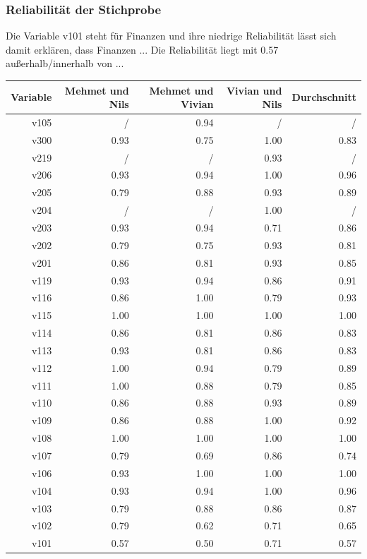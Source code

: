 \subsubsection{Reliabilität der Stichprobe} 
Die Variable v101 steht für Finanzen und ihre niedrige Reliabilität lässt sich damit erklären, dass Finanzen ... Die Reliabilität liegt mit 0.57 außerhalb/innerhalb von ...  
\begin{table}[H]
	\centering
	\begin{longtable}{rrrrr}
		\hline
		Variable & Mehmet und Nils & Mehmet und Vivian & Vivian und Nils & Durchschnitt \\ 
		\hline \hline
		v105 & / & 0.94 & / & / \\ 
		v300 & 0.93 & 0.75 & 1.00 & 0.83 \\ 
		v219 & / & / & 0.93 & / \\ 
		v206 & 0.93 & 0.94 & 1.00 & 0.96 \\ 
		v205 & 0.79 & 0.88 & 0.93 & 0.89 \\ 
		v204 & / & / & 1.00 & / \\ 
		v203 & 0.93 & 0.94 & 0.71 & 0.86 \\ 
		v202 & 0.79 & 0.75 & 0.93 & 0.81 \\ 
		v201 & 0.86 & 0.81 & 0.93 & 0.85 \\ 
		v119 & 0.93 & 0.94 & 0.86 & 0.91 \\ 
		v116 & 0.86 & 1.00 & 0.79 & 0.93 \\ 
		v115 & 1.00 & 1.00 & 1.00 & 1.00 \\ 
		v114 & 0.86 & 0.81 & 0.86 & 0.83 \\ 
		v113 & 0.93 & 0.81 & 0.86 & 0.83 \\ 
		v112 & 1.00 & 0.94 & 0.79 & 0.89 \\ 
		v111 & 1.00 & 0.88 & 0.79 & 0.85 \\ 
		v110 & 0.86 & 0.88 & 0.93 & 0.89 \\ 
		v109 & 0.86 & 0.88 & 1.00 & 0.92 \\ 
		v108 & 1.00 & 1.00 & 1.00 & 1.00 \\ 
		v107 & 0.79 & 0.69 & 0.86 & 0.74 \\ 
		v106 & 0.93 & 1.00 & 1.00 & 1.00 \\ 
		v104 & 0.93 & 0.94 & 1.00 & 0.96 \\ 
		v103 & 0.79 & 0.88 & 0.86 & 0.87 \\ 
		v102 & 0.79 & 0.62 & 0.71 & 0.65 \\ 
		v101 & 0.57 & 0.50 & 0.71 & 0.57 \\ 
		\hline
	\end{longtable}
\end{table}



